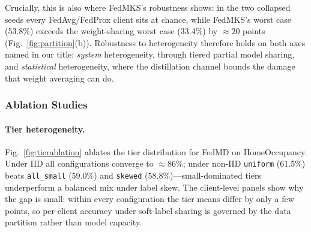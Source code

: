 \documentclass[conference]{IEEEtran}
\begin{document}
Crucially, this is also where FedMKS's robustness shows: in the two
collapsed seeds every FedAvg/FedProx client sits at chance, while
FedMKS's worst case (53.8\%) exceeds the weight-sharing worst case
(33.4\%) by ${\approx}20$ points
(Fig.~\ref{fig:partition}(b)).  Robustness to heterogeneity therefore
holds on both axes named in our title: \emph{system} heterogeneity,
through tiered partial model sharing, and \emph{statistical}
heterogeneity, where the distillation channel bounds the damage that
weight averaging can do.

\subsubsection{Ablation Studies}

\paragraph{Tier heterogeneity.}
Fig.~\ref{fig:tierablation} ablates the tier distribution for FedMD on
HomeOccupancy.  Under IID all configurations converge to
${\approx}86\%$; under non-IID \texttt{uniform} (61.5\%) beats
\texttt{all\_small} (59.0\%) and \texttt{skewed} (58.8\%)---small-dominated
tiers underperform a balanced mix under label skew.  The client-level
panels show why the gap is small: within every configuration the tier
means differ by only a few points, so per-client accuracy under
soft-label sharing is governed by the data partition rather than model
capacity.
\end{document}
